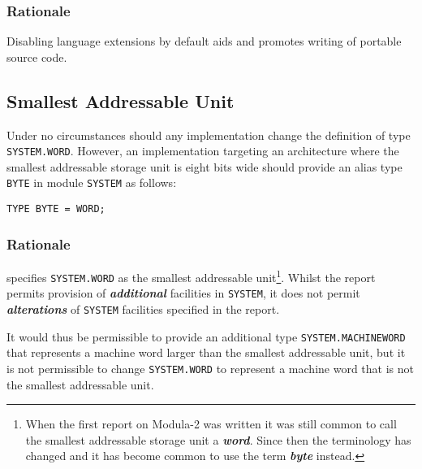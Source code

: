 \documentclass[10pt,a4paper]{article}
\renewcommand{\emph}[1]{\textbf{\textit{#1}}}
\begin{document}
\subsubsection{Rationale}
Disabling language extensions by default aids and promotes writing of portable
source code.


\subsection{Smallest Addressable Unit}

Under no circumstances should any implementation change the definition of type
\verb|SYSTEM.WORD|. However, an implementation targeting an architecture where
the smallest addressable storage unit is eight bits wide should provide an
alias type \verb|BYTE| in module \verb|SYSTEM| as follows:

\lstset{style=modula2}
\begin{lstlisting}
TYPE BYTE = WORD;
\end{lstlisting}

\subsubsection{Rationale}

\cite[p.153]{Wirth88} specifies \verb|SYSTEM.WORD| as the smallest addressable
unit\footnote{When the first report on Modula-2 was written it was still common
to call the smallest addressable storage unit a \emph{word}. Since then the
terminology has changed and it has become common to use the term \emph{byte}
instead.}. Whilst the report permits provision of \emph{additional} facilities
in \verb|SYSTEM|, it does not permit \emph{alterations} of \verb|SYSTEM|
facilities specified in the report.

It would thus be permissible to provide an additional type
\verb|SYSTEM.MACHINEWORD| that represents a machine word larger than the
smallest addressable unit, but it is not permissible to change
\verb|SYSTEM.WORD| to represent a machine word that is not the smallest
addressable unit.


\end{document}
